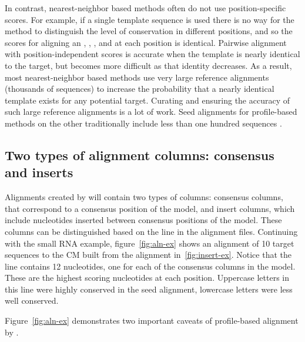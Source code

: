 In contrast, nearest-neighbor based methods often do not use
position-specific scores. For example, if a single template sequence
is used there is no way for the method to distinguish the level of
conservation in different positions, and so the scores for aligning an
, , , and  at each position is
identical.
Pairwise alignment with position-independent scores is accurate when
the template is nearly identical to the target, but becomes more
difficult as that identity decreases. As a result, most
nearest-neighbor based methods use very large reference alignments
(thousands of sequences) to increase the probability that a nearly
identical template exists for any potential target. Curating and
ensuring the accuracy of such large reference alignments is a lot of
work. Seed alignments for profile-based methods on the other
traditionally include less than one hundred sequences \cite{Finn10,Gardner09}. 

\subsection{Two types of alignment columns: consensus and inserts}

Alignments created by  will contain two types of
columns: consensus columns, that correspond to a consensus position of
the model, and insert columns, which include nucleotides
inserted between consensus positions of the model. These columns can
be distinguished based on the  line in the alignment
files. Continuing with the small RNA example, figure~\ref{fig:aln-ex}
shows an alignment of 10 target sequences to the CM built from the
alignment in~\ref{fig:insert-ex}. Notice that the  line
contains 12 nucleotides, one for each of the consensus columns in the model.
These are the highest scoring nucleotides at each position. Uppercase
letters in this line were highly conserved in the seed alignment,
lowercase letters were less well conserved.

Figure~\ref{fig:aln-ex} demonstrates two important caveats of
profile-based alignment by . 


